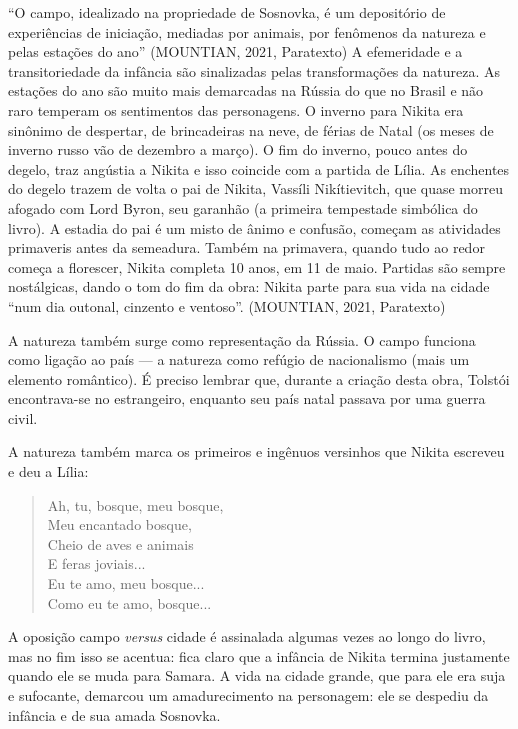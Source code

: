 \documentclass{article}
\begin{document}
\begin{enumerate}
``O campo, idealizado na propriedade de Sosnovka, é um depositório de
experiências de iniciação, mediadas por animais, por fenômenos da
natureza e pelas estações do ano'' (MOUNTIAN, 2021, Paratexto) A
efemeridade e a transitoriedade da infância são sinalizadas pelas
transformações da natureza. As estações do ano são muito mais demarcadas
na Rússia do que no Brasil e não raro temperam os sentimentos das
personagens. O inverno para Nikita era sinônimo de despertar, de
brincadeiras na neve, de férias de Natal (os meses de inverno russo vão
de dezembro a março). O fim do inverno, pouco antes do degelo, traz
angústia a Nikita e isso coincide com a partida de Lília. As enchentes
do degelo trazem de volta o pai de Nikita, Vassíli Nikítievitch, que
quase morreu afogado com Lord Byron, seu garanhão (a primeira tempestade
simbólica do livro). A estadia do pai é um misto de ânimo e confusão,
começam as atividades primaveris antes da semeadura. Também na
primavera, quando tudo ao redor começa a florescer, Nikita completa 10
anos, em 11 de maio. Partidas são sempre nostálgicas, dando o tom do fim
da obra: Nikita parte para sua vida na cidade ``num dia outonal,
cinzento e ventoso''. (MOUNTIAN, 2021, Paratexto)

A natureza também surge como representação da Rússia. O campo funciona
como ligação ao país --- a natureza como refúgio de nacionalismo (mais
um elemento romântico). É preciso lembrar que, durante a criação desta
obra, Tolstói encontrava-se no estrangeiro, enquanto seu país natal
passava por uma guerra civil.

A natureza também marca os primeiros e ingênuos versinhos que Nikita
escreveu e deu a Lília:

\begin{verse}
Ah, tu, bosque, meu bosque,\\
Meu encantado bosque,\\
Cheio de aves e animais\\
E feras joviais...\\
Eu te amo, meu bosque...\\
Como eu te amo, bosque...
\end{verse}

A oposição campo \emph{versus} cidade é assinalada algumas vezes ao
longo do livro, mas no fim isso se acentua: fica claro que a infância de
Nikita termina justamente quando ele se muda para Samara. A vida na
cidade grande, que para ele era suja e sufocante, demarcou um
amadurecimento na personagem: ele se despediu da infância e de sua amada
Sosnovka.


\end{enumerate}
\end{document}
